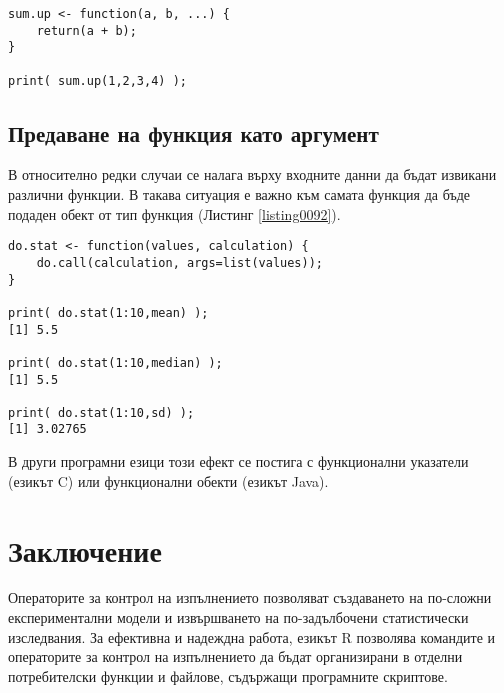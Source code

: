 \begin{lstlisting}[caption=Връщане на стойност от функция, label=listing0091]
sum.up <- function(a, b, ...) {
	return(a + b);
}

print( sum.up(1,2,3,4) );
\end{lstlisting}

\subsection{Предаване на функция като аргумент}

В относително редки случаи се налага върху входните данни да бъдат извикани различни функции. В такава ситуация е важно към самата функция да бъде подаден обект от тип функция (Листинг \ref{listing0092}).

\begin{lstlisting}[caption=Избор на функция за извикване по време на изпълнение, label=listing0092]
do.stat <- function(values, calculation) {
	do.call(calculation, args=list(values));
}

print( do.stat(1:10,mean) );
[1] 5.5

print( do.stat(1:10,median) );
[1] 5.5

print( do.stat(1:10,sd) );
[1] 3.02765
\end{lstlisting}

В други програмни езици този ефект се постига с функционални указатели (езикът C) или функционални обекти (езикът Java).

\section*{Заключение}

Операторите за контрол на изпълнението позволяват създаването на по-сложни експериментални модели и извършването на по-задълбочени статистически изследвания. За ефективна и надеждна работа, езикът R позволява командите и операторите за контрол на изпълнението да бъдат организирани в отделни потребителски функции и файлове, съдържащи програмните скриптове.


